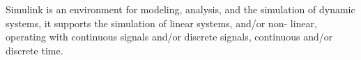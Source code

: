 Simulink is an environment for modeling, analysis, and the simulation of
dynamic systems, it supports the simulation of linear systems, and/or non-
linear, operating with continuous signals and/or discrete signals, continuous
and/or discrete time.

